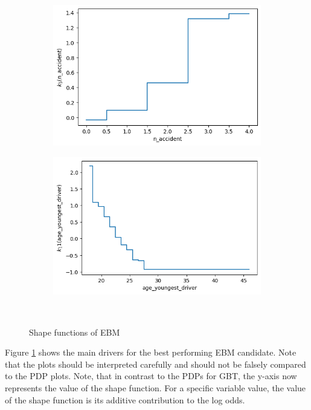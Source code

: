 \documentclass[12pt,titlepage]{article}
\begin{document}
\begin{figure}[H]
\begin{subfigure}{.55\textwidth}
            \includegraphics[width=1\linewidth]{shape_function_n_accident.png}
        \end{subfigure}%
        \begin{subfigure}{.55\textwidth}
            \centering
            \includegraphics[width=1\linewidth]{shape_function_age_youngest_driver.png}
        \end{subfigure} \\
    \caption{Shape functions of EBM}
    \label{fig:shapefct}
\end{figure}
\noindent
Figure \ref{fig:shapefct} shows the main drivers for the best performing EBM candidate. Note that the plots should be interpreted carefully and should not be falsely compared to the PDP plots. Note, that in contrast to the PDPs for GBT, the y-axis now represents the value of the shape function. For a specific variable value, the value of the shape function is its additive contribution to the log odds. \\
\end{document}
